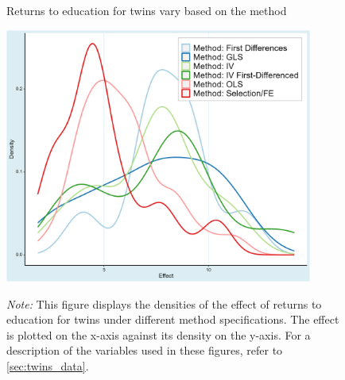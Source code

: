 \clearpage
\begin{figure}[!htbp]
\begin{center}
\caption{Returns to education for twins vary based on the method}
\label{fig:twins_prima_facie}
\includegraphics[width=0.9\textwidth]{Figures/twins_prima_method.png}
\end{center}\vspace{-0.7cm}
\captionsetup{width=0.9\textwidth, font = scriptsize}
\caption*{\emph{Note:} This figure displays the densities of the effect of returns to education for twins under different method specifications. The effect is plotted on the x-axis against its density on the y-axis. For a description of the variables used in these figures, refer to \autoref{sec:twins_data}.}
\end{figure}












